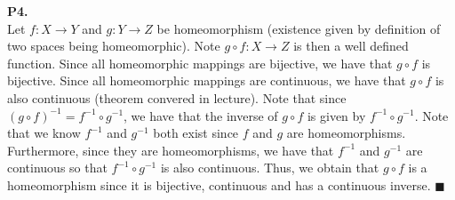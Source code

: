 \documentclass{article}
\begin{document}
    \textbf{P4.}\\
    Let $f: X \to Y$ and $g: Y \to Z$ be homeomorphism (existence given by definition of two spaces being homeomorphic).
    Note $g\circ f: X \to Z$ is then a well defined function. Since all homeomorphic mappings are bijective, we have that
    $g\circ f$ is bijective. Since all homeomorphic mappings are continuous, we have that $g\circ f$ is also continuous (theorem
    convered in lecture). Note that since $(g\circ f)^{-1} = f^{-1}\circ g^{-1}$, we have that the inverse of $g\circ f$ is given
    by $f^{-1}\circ g^{-1}$. Note that we know $f^{-1}$ and $g^{-1}$ both exist since $f$ and $g$ are homeomorphisms. Furthermore,
    since they are homeomorphisms, we have that $f^{-1}$ and $g^{-1}$ are continuous so that $f^{-1}\circ g^{-1}$ is also
    continuous. Thus, we obtain that $g\circ f$ is a homeomorphism since it is bijective, continuous and has a continuous inverse.
    \hfill$\blacksquare$\\
\end{document}
